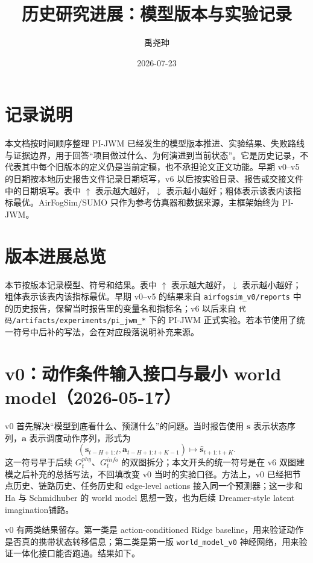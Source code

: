 \documentclass[UTF8,a4paper,11pt]{ctexart}
\title{\pjwm{} 历史研究进展：模型版本与实验记录}
\author{禹尧珅}
\date{2026-07-23}
\newcommand{\code}[1]{\texttt{#1}}
\newcommand{\pjwm}{PI-JWM}
\begin{document}
\pagestyle{plain}
\maketitle
\tableofcontents
\clearpage
\section*{记录说明}
本文档按时间顺序整理 \pjwm{} 已经发生的模型版本推进、实验结果、失败路线与证据边界，用于回答“项目做过什么、为何演进到当前状态”。它是历史记录，不代表其中每个旧版本的定义仍是当前定稿，也不承担论文正文功能。早期 v0--v5 的日期按本地历史报告文件记录日期填写，v6 以后按实验目录、报告或交接文件中的日期填写。表中 $\uparrow$ 表示越大越好，$\downarrow$ 表示越小越好；粗体表示该表内该指标最优。AirFogSim/SUMO 只作为参考仿真器和数据来源，主框架始终为 \pjwm{}。
\section{版本进展总览}

本节按版本记录模型、符号和结果。表中 $\uparrow$ 表示越大越好，$\downarrow$ 表示越小越好；粗体表示该表内该指标最优。早期 v0--v5 的结果来自 \code{airfogsim\_v0/reports} 中的历史报告，保留当时报告里的变量名和指标名；v6 以后来自 \code{代码/artifacts/experiments/pi\_jwm\_*} 下的 PI-JWM 正式实验。若本节使用了统一符号中后补的写法，会在对应段落说明补充来源。

\section{v0：动作条件输入接口与最小 world model（2026-05-17）}

v0 首先解决“模型到底看什么、预测什么”的问题。当时报告使用 $\mathbf{s}$ 表示状态序列，$\mathbf{a}$ 表示调度动作序列，形式为
\[
(\mathbf{s}_{t-H+1:t},\mathbf{a}_{t-H+1:t+K-1})\mapsto \hat{\mathbf{s}}_{t+1:t+K}.
\]
这一符号早于后续 $G_t^{phy}$、$G_t^{info}$ 的双图拆分；本文开头的统一符号是在 v6 双图建模之后补充的总括写法，不回填改变 v0 当时的实验口径。方法上，v0 已经把节点历史、链路历史、任务历史和 edge-level actions 接入同一个预测器；这一步和 Ha 与 Schmidhuber 的 world model 思想一致，也为后续 Dreamer-style latent imagination铺路。

v0 有两类结果留存。第一类是 action-conditioned Ridge baseline，用来验证动作是否真的携带状态转移信息；第二类是第一版 \code{world\_model\_v0} 神经网络，用来验证一体化接口能否跑通。结果如下。

\begin{table}[H]
\centering
\small
{}
\caption{v0 动作条件 baseline 在 held-out seed 4 上的结果。}
\end{table}
\end{document}
